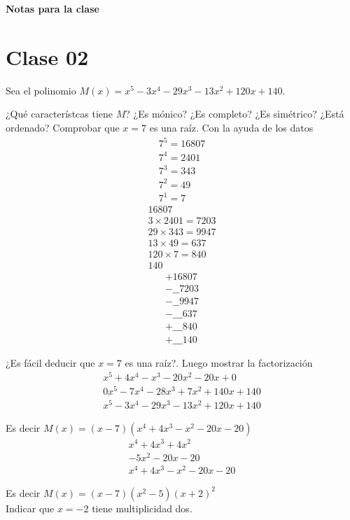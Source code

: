 \documentclass[12pt]{article}
\begin{document}
    \begin{center}
        \textbf{\Large Notas para la clase}
    \end{center}

    \section{Clase 02}
    {
        Sea el polinomio $M(x) = x^5 - 3x^4 - 29x^3 - 13x^2 + 120x + 140.$

        ¿Qué característcas tiene $M$? ¿Es mónico? ¿Es completo? ¿Es simétrico? ¿Está ordenado?
        Comprobar que $x = 7$ es una raíz. Con la ayuda de los datos
        \begin{gather*}
            7^5 = 16807 \\
            7^4 = 2401 \\
            7^3 = 343 \\
            7^2 = 49 \\
            7^1 = 7
        \end{gather*}
        \begin{align*}
            16807 \\
            3\times 2401 = 7203\\
            29\times 343 = 9947\\
            13\times 49 = 637\\
            120\times 7 = 840\\
            140
        \end{align*}
        \begin{align*}
            +16807 \\
            -\_\_7203\\
            -\_\_9947\\
            -\_\_\_637\\
            +\_\_\_840\\
            +\_\_\_140
        \end{align*}

        ¿Es fácil deducir que $x = 7$ es una raíz?. Luego mostrar la factorización
        \begin{align*}
            x^5 + 4x^4 - x^3 - 20x^2 - 20x + 0 \\
            0x^5 - 7x^4 - 28x^3 + 7x^2 + 140x + 140\\
            x^5 - 3x^4 - 29x^3 - 13x^2 + 120x + 140
        \end{align*}

        Es decir $M(x) = (x - 7)(x^4 + 4x^3 - x^2 - 20x - 20)$
        \begin{align*}
            x^4 + 4x^3 + 4x^2 \\
            -5x^2 - 20x - 20\\
            x^4 + 4x^3 - x^2 - 20x - 20
        \end{align*}

        Es decir $M(x) = (x - 7)(x^2 - 5)(x + 2)^2$\\
        Indicar que $x = -2$ tiene multiplicidad dos.
    }\label{sec:clase-02}
\end{document}
